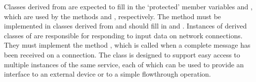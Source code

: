 Classes derived from  are expected to
fill in the `protected' member variables  and
, which are used by the methods
 and , respectively.
The method  must be implemented in classes derived from
 and should fill in
 and .
Instances of derived classes of
 are responsible for
responding to input data on \yarp{} network connections.
They must implement the method , which is called when a complete
message has been received on a connection.
The 
class is designed to support easy access to multiple instances of the same service, each
of which can be used to provide an interface to an external device or to a simple
flow\longDash{}through operation.\\

